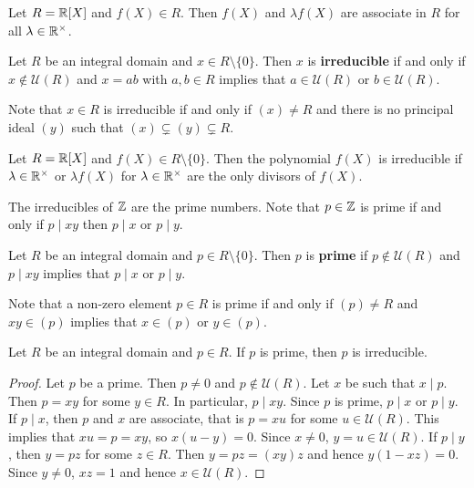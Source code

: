 \begin{example}
	Let $R=\mathbb{R}[X]$ and $f(X)\in R$. Then $f(X)$ and $\lambda f(X)$ are 
	associate in $R$ for all $\lambda\in\mathbb{R}^{\times}$. 	
\end{example}

\begin{definition}
	Let $R$ be an integral domain and $x\in R\setminus\{0\}$. Then $x$ is \textbf{irreducible} 
	if and only if $x\not\in\mathcal{U}(R)$ 
	and $x=ab$ with $a,b\in R$ implies that $a\in\mathcal{U}(R)$ or $b\in\mathcal{U}(R)$. 
\end{definition}

Note that $x\in R$ is irreducible if and only if $(x)\ne R$ 
and there is no principal ideal $(y)$ such that 
$(x)\subsetneq (y)\subsetneq R$.

\begin{example}
	Let $R=\mathbb{R}[X]$ and $f(X)\in R\setminus\{0\}$. Then the polynomial $f(X)$ is irreducible if 
	$\lambda\in\mathbb{R}^{\times}$ or $\lambda f(X)$ for $\lambda\in\mathbb{R}^{\times}$ 
	are the only divisors
	of $f(X)$.  
\end{example}

The irreducibles of $\mathbb{Z}$ are the prime numbers. Note that $p\in \mathbb{Z}$
is prime if and only if $p\mid xy$ then $p\mid x$ or $p\mid y$. 

\begin{definition}
	Let $R$ be an integral domain and $p\in R\setminus\{0\}$. Then  
	$p$ is \textbf{prime} if $p\not\in\mathcal{U}(R)$ and 
	$p\mid xy$ implies that $p\mid x$ or $p\mid y$. 
\end{definition}

Note that a non-zero element $p\in R$ is prime 
if and only if $(p)\ne R$ and 
$xy\in (p)$ implies that $x\in (p)$ or $y\in (p)$. 

\begin{proposition}
	Let $R$ be an integral domain and $p\in R$. 
	If $p$ is prime, then $p$ is irreducible. 
\end{proposition}

\begin{proof}
	Let $p$ be a prime. Then $p\ne 0$ and $p\not\in\mathcal{U}(R)$. Let $x$ be such that
	$x\mid p$. Then $p=xy$ for some $y\in R$. In particular, $p\mid xy$. 
	Since $p$ is prime, $p\mid x$ or $p\mid y$. If $p\mid x$, then
	$p$ and $x$ are associate, that is $p=xu$ for some $u\in\mathcal{U}(R)$.
	This implies that $xu=p=xy$, so $x(u-y)=0$. Since $x\ne 0$, 
	$y=u\in\mathcal{U}(R)$. 
	If $p\mid y$, then $y=pz$ for some $z\in R$. Then
	$y=pz=(xy)z$ and hence $y(1-xz)=0$. Since $y\ne 0$, 
	$xz=1$ and hence $x\in\mathcal{U}(R)$. 
\end{proof}

